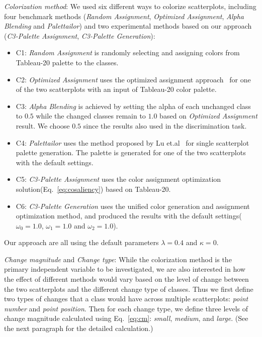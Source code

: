 \emph{Colorization method}: We used six different ways to colorize scatterplots, including four benchmark methods (\emph{Random Assignment}, \emph{Optimized Assignment}, \emph{Alpha Blending} and \emph{Palettailor}) and two experimental methods based on our approach (\emph{C3-Palette Assignment}, \emph{C3-Palette Generation}):
\begin{itemize}

     \item C1: \emph{Random Assignment} is randomly selecting and assigning colors from Tableau-20 palette to the classes.

     \item C2: \emph{Optimized Assignment} uses the optimized assignment approach~\cite{Wang2018} for one of the two scatterplots with an input of Tableau-20 color palette.
     \item C3: \emph{Alpha Blending} is achieved by setting the alpha of each unchanged class to $0.5$ while the changed classes remain to $1.0$ based on \emph{Optimized Assignment} result. We choose $0.5$ since the results also used in the discrimination task.
     \item C4: \emph{Palettailor} uses the method proposed by Lu et.al~\cite{Lu21} for single scatterplot palette generation. The palette is generated for one of the two scatterplots with the default settings.
     \item C5: \emph{C3-Palette Assignment} uses the color assignment optimization solution(Eq.~\ref{eq:cosaliency}) based on Tableau-20.
     \item C6: \emph{C3-Palette Generation} uses the unified color generation and assignment optimization method, and produced the results with the default settings($\omega_0=1.0$, $\omega_1=1.0$ and $\omega_2=1.0$).
\end{itemize}
Our approach are all using the default parameters $\lambda=0.4$ and $\kappa=0$.

\emph{Change magnitude} and \emph{Change type}: While the colorization method is the primary independent variable to be investigated, we are also interested in how the effect of different methods would vary based on the level of change between the two scatterplots and the different change type of classes. Thus we first define two types of changes that a class would have across multiple scatterplots: \emph{point number} and \emph{point position}. Then for each change type, we define three levels of change magnitude calculated using Eq.~\ref{eq:cm}: \emph{small}, \emph{medium}, and \emph{large}. (See the next paragraph for the detailed calculation.)

